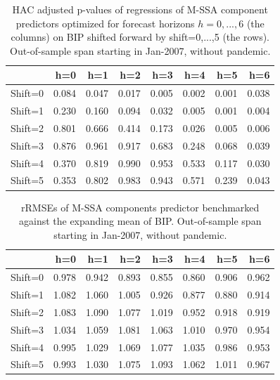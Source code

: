 \documentclass[a4paper]{article}
\begin{document}
\begin{table}[ht]
\centering
\begin{tabular}{rrrrrrrr}
  \hline
 & h=0 & h=1 & h=2 & h=3 & h=4 & h=5 & h=6 \\ 
  \hline
Shift=0 & 0.084 & 0.047 & 0.017 & 0.005 & 0.002 & 0.001 & 0.038 \\ 
  Shift=1 & 0.230 & 0.160 & 0.094 & 0.032 & 0.005 & 0.001 & 0.004 \\ 
  Shift=2 & 0.801 & 0.666 & 0.414 & 0.173 & 0.026 & 0.005 & 0.006 \\ 
  Shift=3 & 0.876 & 0.961 & 0.917 & 0.683 & 0.248 & 0.068 & 0.039 \\ 
  Shift=4 & 0.370 & 0.819 & 0.990 & 0.953 & 0.533 & 0.117 & 0.030 \\ 
  Shift=5 & 0.353 & 0.802 & 0.983 & 0.943 & 0.571 & 0.239 & 0.043 \\ 
   \hline
\end{tabular}
\caption{HAC adjusted p-values of regressions of M-SSA component predictors optimized for forecast horizons $h=0,...,6$  (the columns) on BIP shifted forward by shift=0,...,5 (the rows). Out-of-sample span starting in Jan-2007, without pandemic.} 
\label{p_val_wc}
\end{table}%
\begin{table}[ht]
\centering
\begin{tabular}{rrrrrrrr}
  \hline
 & h=0 & h=1 & h=2 & h=3 & h=4 & h=5 & h=6 \\ 
  \hline
Shift=0 & 0.978 & 0.942 & 0.893 & 0.855 & 0.860 & 0.906 & 0.962 \\ 
  Shift=1 & 1.082 & 1.060 & 1.005 & 0.926 & 0.877 & 0.880 & 0.914 \\ 
  Shift=2 & 1.083 & 1.090 & 1.077 & 1.019 & 0.952 & 0.918 & 0.919 \\ 
  Shift=3 & 1.034 & 1.059 & 1.081 & 1.063 & 1.010 & 0.970 & 0.954 \\ 
  Shift=4 & 0.995 & 1.029 & 1.069 & 1.077 & 1.035 & 0.986 & 0.953 \\ 
  Shift=5 & 0.993 & 1.030 & 1.075 & 1.093 & 1.062 & 1.011 & 0.967 \\ 
   \hline
\end{tabular}
\caption{rRMSEs of M-SSA components predictor benchmarked against the expanding mean of BIP. Out-of-sample span starting in Jan-2007, without pandemic.} 
\label{rRMSE_mSSA_comp_mean_wc}
\end{table}
\end{document}
